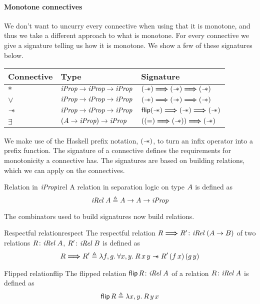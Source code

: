 \documentclass[thesis.tex]{subfiles}
\begin{document}
\paragraph*{Monotone connectives}
We don't want to uncurry every connective when using that it is monotone, and thus we take a different approach to what is monotone. For every connective we give a signature telling us how it is monotone. We show a few of these signatures below.

\begin{center}
  \begin{tabular}{lll}
    Connective & Type                           & Signature                                           \\
    \hline
    $*$        & $\textit{iProp} \to \textit{iProp} \to \textit{iProp}$    & $(\mathrel{-\!\!\ast}) \mathrel{\bm{\Longrightarrow}} (\mathrel{-\!\!\ast}) \mathrel{\bm{\Longrightarrow}} (\mathrel{-\!\!\ast})$      \\
    $\lor$     & $\textit{iProp} \to \textit{iProp} \to \textit{iProp}$    & $(\mathrel{-\!\!\ast}) \mathrel{\bm{\Longrightarrow}} (\mathrel{-\!\!\ast}) \mathrel{\bm{\Longrightarrow}} (\mathrel{-\!\!\ast})$      \\
    $\mathrel{-\!\!\ast}$    & $\textit{iProp} \to \textit{iProp} \to \textit{iProp}$    & $\bm{\textsf{\upshape flip}}(\mathrel{-\!\!\ast}) \mathrel{\bm{\Longrightarrow}} (\mathrel{-\!\!\ast}) \mathrel{\bm{\Longrightarrow}} (\mathrel{-\!\!\ast})$ \\
    $\exists$  & $(A \to \textit{iProp}) \to \textit{iProp}$ & $((=) \mathrel{\bm{\Longrightarrow}} (\mathrel{-\!\!\ast})) \mathrel{\bm{\Longrightarrow}} (\mathrel{-\!\!\ast})$
  \end{tabular}
\end{center}
We make use of the Haskell prefix notation, $(\mathrel{-\!\!\ast})$, to turn an infix operator into a prefix function. The signature of a connective defines the requirements for monotonicity a connective has. The signatures are based on building relations, which we can apply on the connectives.
\begin{definition}{Relation in $\textit{iProp}$}{irel}
  A relation in separation logic on type $A$ is defined as
  \[\textit{iRel}\ A \triangleq A \to A \to \textit{iProp}\]
\end{definition}
The combinators used to build signatures now build relations.
\begin{definition}{Respectful relation}{respect}
  The respectful relation $\rel \respect \rel'\colon \Rel\ (\sigax\to\sigaxB)$ of two relations $R\colon\textit{iRel}\ A$, $R'\colon\textit{iRel}\ B$ is defined as
  \begin{align*}
    \rel \respect \rel' \eqdef \Lam \func, \funcB. \All \var,\varB. \rel\, \var\, \varB \wand \rel'\, (\func\, \var)\, (\funcB\, \varB)
  \end{align*}
\end{definition}
\begin{definition}{Flipped relation}{flip}
  The flipped relation $\bm{\textsf{\upshape flip}}\, R\colon\textit{iRel}\ A$ of a relation $R\colon\textit{iRel}\ A$ is defined as
  \[\flip\, \rel \eqdef \Lam \var, \varB. \rel\, \varB\, \var\]
\end{definition}
\end{document}
